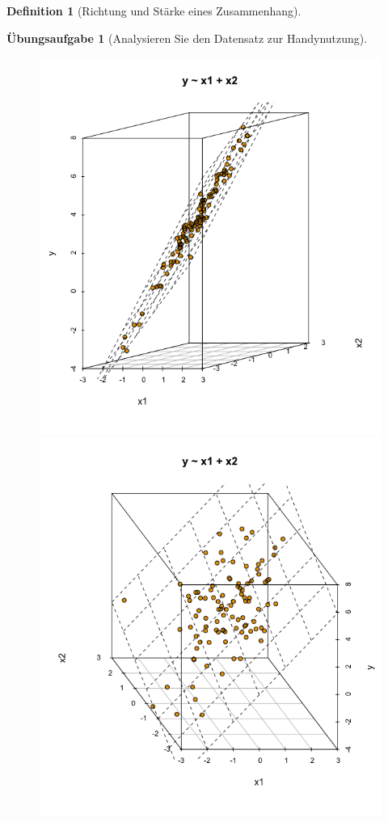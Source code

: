 \documentclass[
  a4paper,
  DIV=11]{scrreprt}
\theoremstyle{definition}
\newtheorem{exercise}{Übungsaufgabe}[chapter]
\theoremstyle{definition}
\theoremstyle{definition}
\newtheorem{definition}{Definition}[chapter]
\theoremstyle{remark}
\begin{document}
\begin{definition}[Richtung und Stärke eines
Zusammenhang]
\begin{exercise}[Analysieren Sie den Datensatz zur
Handynutzung]
\begin{figure}
\begin{minipage}{0.33\linewidth}
\includegraphics{img/3d_scatter1.png}

\end{minipage}%
%
\begin{minipage}{0.33\linewidth}

\includegraphics{img/3d_scatter2.png}


\end{minipage}
\end{figure}
\end{exercise}
\end{definition}
\end{document}
